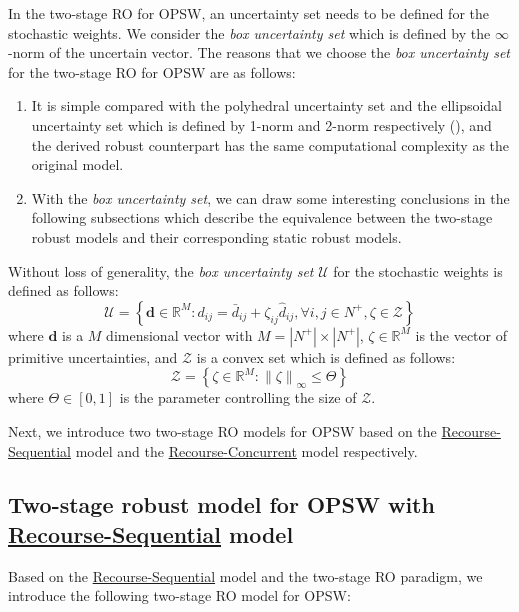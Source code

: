 \documentclass[preprint,review,10pt,round,authoryear]{elsarticle}\usepackage[]{graphicx}\usepackage[]{color}
\theoremstyle{plain}
\theoremstyle{definition}
\theoremstyle{remark}
\begin{document}
In the two-stage RO for OPSW, an uncertainty set needs to be defined for the stochastic weights. We consider the \emph{box uncertainty set} which is defined by the $\infty$-norm of the uncertain vector. The reasons that we choose the \emph{box uncertainty set} for the two-stage RO for OPSW are as follows:
\begin{enumerate}
\item It is simple compared with the polyhedral uncertainty set and the ellipsoidal uncertainty set which is defined by 1-norm and 2-norm respectively (\cite{bertsimas2004robust,ben2009robust}), and the derived robust counterpart has the same computational complexity as the original model.   
\item With the \emph{box uncertainty set}, we can draw some interesting conclusions in the following subsections which describe the equivalence between the two-stage robust models and their corresponding static robust models.
\end{enumerate}

Without loss of generality, the \emph{box uncertainty set} $\mathcal{U}$ for the stochastic weights is defined as follows:
\begin{equation}
\label{uncertainty:set1}
\mathcal{U}=\left\{\mathbf{d}\in\mathbb{R}^{M}:d_{ij}=\bar{d}_{ij}+\zeta_{ij}\hat{d}_{ij},\forall i,j\in N^+,\zeta\in \mathcal{Z}\right\}
\end{equation}
where $\mathbf{d}$ is a $M$ dimensional vector with $M=|N^+|\times|N^+|$, $\zeta\in\mathbb{R}^M$ is the vector of primitive uncertainties, and $\mathcal{Z}$ is a convex set which is defined as follows:
\begin{equation}
\label{uncertainty:set2}
\mathcal{Z}=\left\{\zeta\in\mathbb{R}^{M}: \left \|\zeta  \right \|_{\infty}\leq \Theta\right\}
\end{equation}
where $\Theta\in [0,1]$ is the parameter controlling the size of $\mathcal{Z}$. 


Next, we introduce two two-stage RO models for OPSW based on the \hyperref[eq:rs]{Recourse-Sequential} model and the \hyperref[eq:rc]{Recourse-Concurrent} model respectively.

\subsection{Two-stage robust model for OPSW with \hyperref[eq:rs]{Recourse-Sequential} model}

Based on the \hyperref[eq:rs]{Recourse-Sequential} model and the two-stage RO paradigm, we introduce the following two-stage RO model for OPSW:
\end{document}
